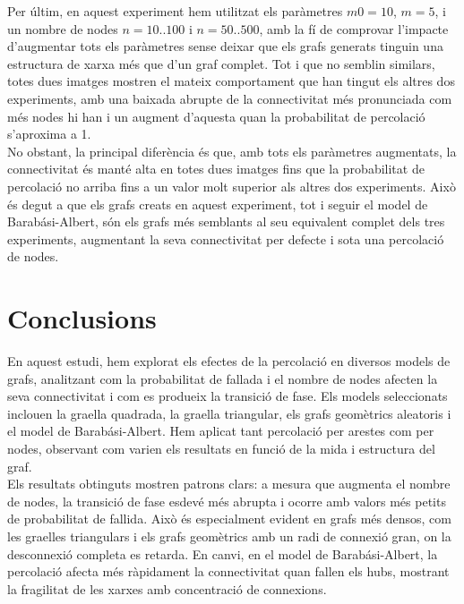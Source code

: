 \documentclass[a4paper]{article}
\begin{document}
	Per últim, en aquest experiment hem utilitzat els paràmetres $m0 = 10$, $m = 5$, i un nombre de nodes $n = 10..100$ i $n = 50..500$, amb la fí de comprovar l'impacte d'augmentar tots els paràmetres sense deixar que els grafs generats tinguin una estructura de xarxa més que d'un graf complet. Tot i que no semblin similars, totes dues imatges mostren el mateix comportament que han tingut els altres dos experiments, amb una baixada abrupte de la connectivitat més pronunciada com més nodes hi han i un augment d'aquesta quan la probabilitat de percolació s'aproxima a 1. \\
	
	No obstant, la principal diferència és que, amb tots els paràmetres augmentats, la connectivitat és manté alta en totes dues imatges fins que la probabilitat de percolació no arriba fins a un valor molt superior als altres dos experiments. Això és degut a que els grafs creats en aquest experiment, tot i seguir el model de Barabási-Albert, són els grafs més semblants al seu equivalent complet dels tres experiments, augmentant la seva connectivitat per defecte i sota una percolació de nodes.  

	\newpage	
	\section{Conclusions}
	
	En aquest estudi, hem explorat els efectes de la percolació en diversos models de grafs, analitzant com la probabilitat de fallada i el nombre de nodes afecten la seva connectivitat i com es produeix la transició de fase. Els models seleccionats inclouen la graella quadrada, la graella triangular, els grafs geomètrics aleatoris i el model de Barabási-Albert. Hem aplicat tant percolació per arestes com per nodes, observant com varien els resultats en funció de la mida i estructura del graf. \\
	
	Els resultats obtinguts mostren patrons clars: a mesura que augmenta el nombre de nodes, la transició de fase esdevé més abrupta i ocorre amb valors més petits de probabilitat de fallida. Això és especialment evident en grafs més densos, com les graelles triangulars i els grafs geomètrics amb un radi de connexió gran, on la desconnexió completa es retarda. En canvi, en el model de Barabási-Albert, la percolació afecta més ràpidament la connectivitat quan fallen els hubs, mostrant la fragilitat de les xarxes amb concentració de connexions. \\
	
\end{document}
